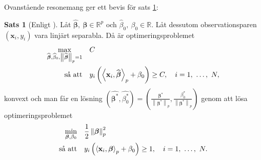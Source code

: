 \documentclass[a4paper, 12pt]{report}
\theoremstyle{definition}
\newtheorem{thm}{Sats}[section]
\newtheorem{cor}[thm]{Korollarium}
\theoremstyle{remark}
\newcommand{\bfbeta}{{\boldsymbol{\beta}}}
\newcommand{\bfx}{\mathbf{x}}
\newcommand{\llangle}{\left\langle}
\newcommand{\rrangle}{\right\rangle}
\newcommand{\inner}[2]{\llangle #1, #2 \rrangle}
\begin{document}
Ovanstående resonemang ger ett bevis för sats \ref{thm:primallinearproblem}:
\begin{thm}[Enligt \cite{ESL}]\label{thm:primallinearproblem}
	Låt $\widehat{\bfbeta},~\bfbeta \in \mathbb{R}^p$ och $\widehat{\beta}_0,~\beta_0 \in \mathbb{R}$. Låt dessutom observationsparen $\left(\mathbf{x}_i, y_i\right)$ vara linjärt separabla. Då är optimeringsproblemet
	\begin{equation*}
	\begin{aligned}
	\operatornamewithlimits{max}_{\widehat{\bfbeta}, \widehat{\beta}_0, \left\|\widehat{\bfbeta}
\right\|_p=1} & & &C\\
	\text{så att} & & &y_i\left(\inner{\bfx_i}{\widehat{\bfbeta}}_p+\beta_0\right)\geq C,\quad i=1,~\dots,~N,
	\end{aligned}
	\end{equation*}
	konvext och man får en lösning $\left(\widehat{\bfbeta^*}, \widehat{\beta_0^*}\right)=\left(\frac{\bfbeta^*}{\left\|\bfbeta^*\right\|_p}, \frac{\beta^*_0}{\left\|\bfbeta^*\right\|_p}\right)$ genom att lösa optimeringsproblemet
	\begin{equation*}
	\begin{aligned}
	\operatornamewithlimits{min}_{\bfbeta, \beta_0} & & &\frac{1}{2}\left\|\bfbeta
\right\|_p^2\\
	\text{så att} & & &y_i\left(\inner{\bfx_i}{\bfbeta}_p+\beta_0\right)\geq 1,\quad i=1,~\dots,~N.
	\end{aligned}
	\end{equation*}
\end{thm}
\end{document}
